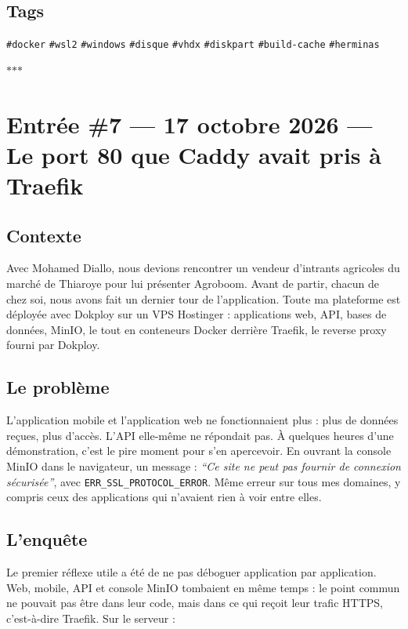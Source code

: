 \documentclass[10pt,twoside,openany]{article}
\newcommand{\entryrule}{\par\vspace{1.2em}\begin{center}\color{accentblue}$\ast$\quad$\ast$\quad$\ast$\end{center}\par}
\newcommand{\tag}[1]{\texttt{\footnotesize\color{tagolive}\#{#1}}}
\begin{document}
\subsection*{Tags}
\tag{docker} \quad \tag{wsl2} \quad \tag{windows} \quad \tag{disque} \quad \tag{vhdx} \quad \tag{diskpart} \quad \tag{build-cache} \quad \tag{herminas}

\entryrule

\section{Entrée \#7 --- 17 octobre 2026 --- Le port 80 que Caddy avait pris à Traefik}

\subsection*{Contexte}
Avec Mohamed Diallo, nous devions rencontrer un vendeur d'intrants agricoles du marché de Thiaroye pour lui présenter Agroboom. Avant de partir, chacun de chez soi, nous avons fait un dernier tour de l'application. Toute ma plateforme est déployée avec Dokploy sur un VPS Hostinger : applications web, API, bases de données, MinIO, le tout en conteneurs Docker derrière Traefik, le reverse proxy fourni par Dokploy.

\subsection*{Le problème}
L'application mobile et l'application web ne fonctionnaient plus : plus de données reçues, plus d'accès. L'API elle-même ne répondait pas. À quelques heures d'une démonstration, c'est le pire moment pour s'en apercevoir. En ouvrant la console MinIO dans le navigateur, un message : \textit{\enquote{Ce site ne peut pas fournir de connexion sécurisée}}, avec \texttt{ERR\_SSL\_PROTOCOL\_ERROR}. Même erreur sur tous mes domaines, y compris ceux des applications qui n'avaient rien à voir entre elles.

\subsection*{L'enquête}
Le premier réflexe utile a été de ne pas déboguer application par application. Web, mobile, API et console MinIO tombaient en même temps : le point commun ne pouvait pas être dans leur code, mais dans ce qui reçoit leur trafic HTTPS, c'est-à-dire Traefik. Sur le serveur :
\end{document}
